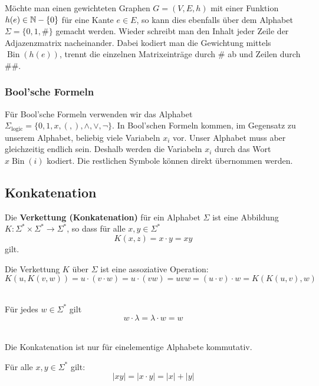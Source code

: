Möchte man einen gewichteten Graphen $G = (V, E, h)$ mit einer Funktion $h(e) \in \mathbb{N} - \{0\}$ für eine Kante $e \in E$, so kann dies ebenfalls über dem Alphabet $\Sigma = \{0, 1, \#\}$ gemacht werden. Wieder schreibt man den Inhalt jeder Zeile der Adjazenzmatrix nacheinander. Dabei kodiert man die Gewichtung mittels $\operatorname{Bin}(h(e))$, trennt die einzelnen Matrixeinträge durch $\#$ ab und Zeilen durch $\#\#$.

\subsubsection{Bool'sche Formeln}
Für Bool'sche Formeln verwenden wir das Alphabet $\Sigma_\text{logic} = \{0, 1, x, (, ), \land, \lor, \lnot\}$. In Bool'schen Formeln kommen, im Gegensatz zu unserem Alphabet, beliebig viele Variabeln $x_i$ vor. Unser Alphabet muss aber gleichzeitig endlich sein. Deshalb werden die Variabeln $x_i$ durch das Wort $x\operatorname{Bin}(i)$ kodiert. Die restlichen Symbole können direkt übernommen werden.

\subsection{Konkatenation}
\begin{definition}
Die \textbf{Verkettung (Konkatenation)} für ein Alphabet $\Sigma$ ist eine Abbildung $K: \Sigma^* \times \Sigma^* \to \Sigma^*$, so dass für alle $x, y \in \Sigma^*$
\[
K(x, z) = x \cdot y = xy
\]
gilt.\\
\end{definition}

\begin{remark}
Die Verkettung $K$ über $\Sigma$ ist eine assoziative Operation:
\[
K(u, K(v, w)) = u \cdot (v \cdot w) = u \cdot (vw) = uvw = (u \cdot v) \cdot w = K(K(u, v), w)
\]\\
\end{remark}

\begin{remark}
Für jedes $w \in \Sigma^*$ gilt
\[
w \cdot \lambda = \lambda \cdot w = w
\]\\
\end{remark}

\begin{remark}
Die Konkatenation ist nur für einelementige Alphabete kommutativ.\\
\end{remark}

\begin{remark}
Für alle $x, y \in \Sigma^*$ gilt:
\[
|xy| = |x \cdot y| = |x| + |y|
\]
\end{remark}


